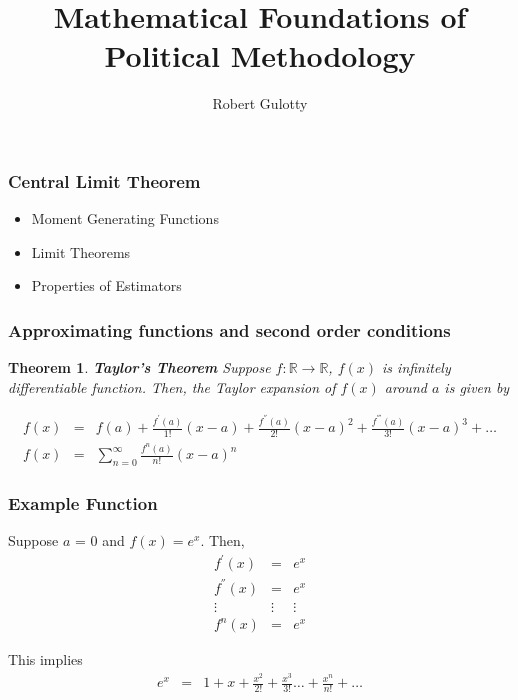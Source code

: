 \documentclass{beamer}
\title[PLSC 43401]{Mathematical Foundations of Political Methodology}
\author{Robert Gulotty}
\institute[Chicago]{University of Chicago}
\newtheorem{thm}{Theorem}
\numberwithin{equation}{section}
\begin{document}
\begin{frame}
\maketitle
\end{frame}


\begin{frame}
\frametitle{Central Limit Theorem}
\begin{itemize}
\item Moment Generating Functions
\item Limit Theorems
\item Properties of Estimators
\end{itemize}
\end{frame}





\begin{frame}
\frametitle{Approximating functions and second order conditions}


\begin{thm}
\textbf{Taylor's Theorem}
Suppose $f:\mathbb{R} \rightarrow \mathbb{R}$, $f(x)$ is infinitely differentiable function.  Then, the Taylor expansion of $f(x)$ around \alert{$a$} is given by 

\begin{eqnarray}
f(x) & = & f(a) + \frac{f^{'}(a)}{1!} (x- a) + \frac{f^{''}(a)}{2!} (x - a)^2 + \frac{f^{'''}(a)}{3!}(x- a)^3 + \hdots \nonumber \\
f(x) & = & \sum_{n=0}^{\infty } \frac{f^{n} (a) }{n!} (x - a)^n \nonumber
\end{eqnarray}

\end{thm}




\end{frame}


\begin{frame}
\frametitle{Example Function}

Suppose $a$ = 0 and $f(x) = e^{x}$.  Then, 
\begin{eqnarray}
f^{'}(x) & = & e^{x} \nonumber \\
f^{''}(x) & = & e^{x} \nonumber \\
\vdots  & \vdots & \vdots \nonumber \\
f^{n} (x) & = & e^{x} \nonumber 
\end{eqnarray}

This implies
\begin{eqnarray}
e^{x} & = & 1 + x + \frac{x^{2}}{2!} + \frac{x^3}{3!} \hdots + \frac{x^{n}}{n!} + \hdots \nonumber \end{eqnarray}

\end{frame}
\end{document}
